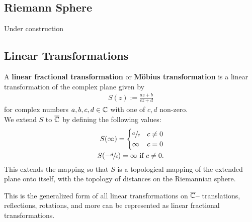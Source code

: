 \documentclass{memoir}
\begin{document}


\subsection{Riemann Sphere}
\label{sub:riemann_sphere}



Under construction

\subsection{Linear Transformations}
\label{sub:linear_transformations}

\begin{defn}
	A \textbf{linear fractional transformation} or \textbf{Möbius transformation} is a linear transformation of the complex plane given by
	\begin{align*}
		S(z) := \frac{az+b}{cz+d}
	\end{align*}
	for complex numbers \(a,b,c,d \in \mathbb{C}\) with one of \(c,d\) non-zero.\\

	We extend \(S\) to \(\overline{\mathbb{C}}\) by defining the following values:
\begin{align*}
	S(\infty) = \begin{cases}
		\sfrac{a}{c} & c\neq 0\\
		\infty & c=0
	\end{cases}\\
	S(-\sfrac{d}{c}) = \infty \text{ if }c\neq 0.
\end{align*}
	This extends the mapping so that \(S\) is a topological mapping of the extended plane onto itself, with the topology of distances on the Riemannian sphere.
\end{defn}
This is the generalized form of all linear transformations on \(\overline{\mathbb{C}}\)-- translations, reflections, rotations, and more can be represented as linear fractional transformations.
\end{document}
